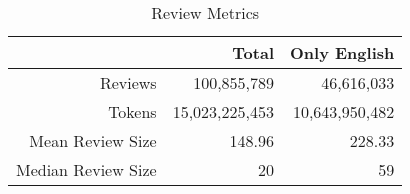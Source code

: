 \begin{table}[h]
    \centering
    \begin{tabular}{r|r|r}
    & Total & Only English\\\hline
        Reviews                 & 100,855,789 & 46,616,033\\
        Tokens                  & 15,023,225,453 & 10,643,950,482\\
        Mean Review Size        & 148.96 & 228.33\\
        Median Review Size      & 20 & 59
    \end{tabular}
    \caption{Review Metrics}
    \label{tab:review_metrics}
\end{table}